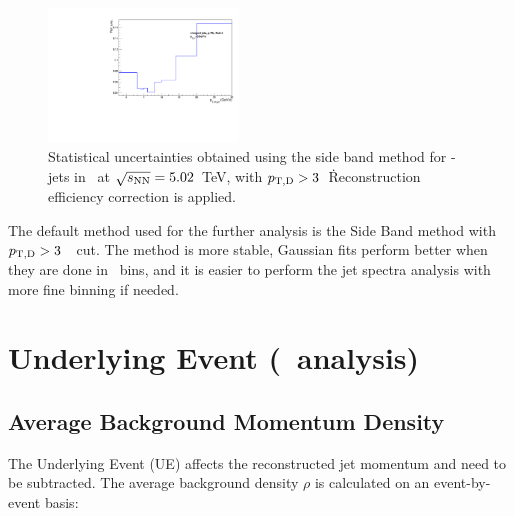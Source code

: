 \begin{figure}[bth]
\centering
\includegraphics[width=0.45\textwidth]{pPbplots/plotsSB_pt3_noDetails/jetPtSpectrumUnc_SB_Rebin_FASTwoSDD_pTD3}

\caption{Statistical uncertainties obtained using the side band method for \Dstar-jets in \pPb\ at $\sqrt{s_{\rm NN}}=5.02$~TeV, with $p_{\mathrm{T,D}}>3$~\GeVc\. Reconstruction efficiency correction is applied.}
\label{fig:JetPt_pPb_SBUnc}
\end{figure}

The default method used for the further analysis is the Side Band method with $p_{\mathrm{T,D}}>3$~\GeVc\ cut. The method is more stable, Gaussian fits perform better when they are done in \ptd\ bins, and it is easier to perform the jet spectra analysis with more fine binning if needed.


\section{Underlying Event (\pPb\ analysis)}
\subsection{Average Background Momentum Density}
\label{sBackSub}

The Underlying Event (UE) affects the reconstructed jet momentum and need to be subtracted.
The average background density $\rho$ is calculated on an event-by-event basis:

